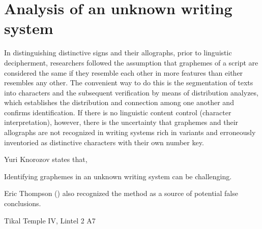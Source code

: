 \documentclass[../main.tex]{subfiles}
\begin{document}
\section{Analysis of an unknown writing system}
In distinguishing distinctive signs and their allographs, prior to linguistic decipherment, 
researchers followed the assumption that graphemes of a script are considered the same if 
they resemble each other in more features than either resembles any other.
The convenient way to do this is the segmentation of texts into characters and the subsequent 
verification by means of distribution analyzes, which establishes the distribution and 
connection among one another and confirms identification. 
If there is no linguistic content control (character interpretation), 
however, there is the uncertainty that graphemes and 
their allographs are not recognized in writing systems rich in variants and erroneously 
inventoried as distinctive characters with their own number key.


Yuri Knorozov states that, 



Identifying graphemes in an unknown writing system can be challenging.




Eric Thompson (\cite[12\psq]{thompson1962catalog}) also recognized the method as a source of 
potential false conclusions.


Tikal Temple IV, Lintel 2 A7
\end{document}
